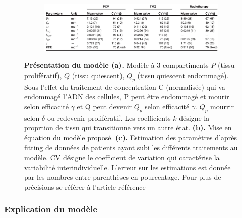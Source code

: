 \documentclass[12pt]{article}
\begin{document}
\begin{figure}
    \vspace{1cm}
    \begin{subfigure}[t]{\textwidth}
    \centering
        \includegraphics[width=\linewidth]{Image/tableau.JPG} 
        \caption{} \label{fig:tableau}
    \end{subfigure}
    
    \caption{\textbf{Présentation du modèle \cite{} (a).} Modèle à 3 compartiments $P$ (tissu prolifératif), $Q$ (tissu quiescent), $Q_{p}$ (tissu quiescent endommagé). Sous l'effet du traitement de concentration C (normalisée) qui va endommagé l'ADN des cellules, P peut être endommagé et mourir selon efficacité $\gamma$ et Q peut devenir $Q_p$ selon efficacité $\gamma$. $Q_{p}$ mourrir selon $\delta$ ou redevenir prolifératif. Les coefficients $k$ désigne la proprtion de tissu qui transitionne vers un autre état.  \textbf{(b).} Mise en équation du modèle proposé. \textbf{(c).} Estimation des paramètres d'après fitting de données de patients ayant subi les différents traitements au modèle. CV désigne le coefficient de variation qui caractérise la variabilité interindividuelle. L'erreur sur les estimations est donnée par les nombres entre parenthèses en pourcentage. Pour plus de précisions se référer à l'article référence\cite{}}
\end{figure}

\subsubsection{Explication du modèle}
\end{document}
